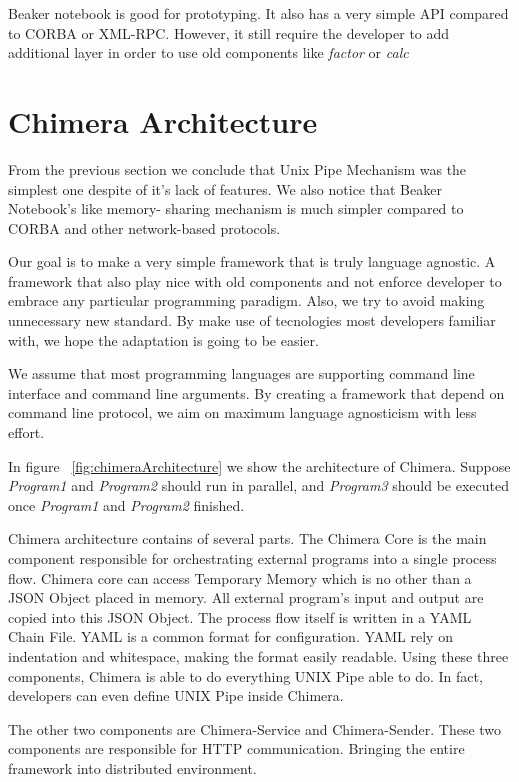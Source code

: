 \documentclass[conference]{IEEEtran}
\begin{document}
Beaker notebook is good for prototyping. It also has a very simple API compared to
CORBA or XML-RPC. However, it still require the developer to add additional layer
in order to use old components like {\it factor} or {\it calc}


\section{Chimera Architecture}

From the previous section we conclude that Unix Pipe Mechanism was the simplest one
despite of it's lack of features. We also notice that Beaker Notebook's like memory-
sharing mechanism is much simpler compared to CORBA and other network-based protocols.

Our goal is to make a very simple framework that is truly language agnostic. A framework
that also play nice with old components and not enforce developer to embrace any 
particular programming paradigm. Also, we try to avoid making unnecessary new standard.
By make use of tecnologies most developers familiar with, we hope the adaptation is
going to be easier.

We assume that most programming languages are supporting command line interface and
command line arguments. By creating a framework that depend on command line protocol,
we aim on maximum language agnosticism with less effort.

In figure ~\ref{fig:chimeraArchitecture} we show the architecture of Chimera. Suppose
{\it Program1} and {\it Program2} should run in parallel, and {\it Program3} should be
executed once {\it Program1} and {\it Program2} finished.

Chimera architecture contains of several parts. The Chimera Core is the main component 
responsible for orchestrating external programs into a single process flow. 
Chimera core can access Temporary Memory which is no other than a JSON Object placed in
memory. All external program's input and output are copied into this JSON Object.
The process flow itself is written in a YAML Chain File. YAML is a common format for
configuration. YAML rely on indentation and whitespace, making the format easily 
readable. Using these three components, Chimera is able to do everything UNIX Pipe
able to do. In fact, developers can even define UNIX Pipe inside Chimera.

The other two components are Chimera-Service and Chimera-Sender. These two components
are responsible for HTTP communication. Bringing the entire framework into distributed
environment.
\end{document}
